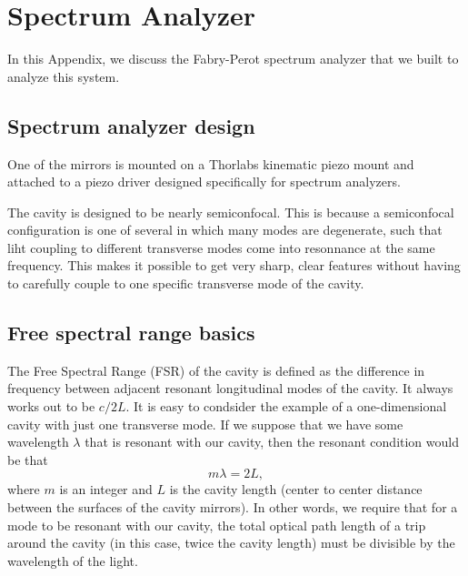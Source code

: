 \chapter{Spectrum Analyzer}
\label{SpectrumAnalyzerAppendix}

In this Appendix, we discuss the Fabry-Perot spectrum analyzer that we built to analyze this system. 

\section{Spectrum analyzer design}
One of the mirrors is mounted on a Thorlabs kinematic piezo mount and attached to a piezo driver designed specifically for spectrum analyzers.

The cavity is designed to be nearly semiconfocal.%
This is because a semiconfocal configuration is one of several in which many modes are degenerate, such that liht coupling to different transverse modes come into resonnance at the same frequency. This makes it possible to get very sharp, clear features without having to carefully couple to one specific transverse mode of the cavity. 


\section{Free spectral range basics}
The Free Spectral Range (FSR) of the cavity is defined as the difference in frequency between adjacent resonant longitudinal modes of the cavity. It always works out to be $c/2L$. 
It is easy to condsider the example of a one-dimensional cavity with just one transverse mode. If we suppose that we have some wavelength $\lambda$ that is resonant with our cavity, then the resonant condition would be that 
\begin{equation}
m\lambda=2L,
\end{equation}
where $m$ is an integer and $L$ is the cavity length (center to center distance between the surfaces of the cavity mirrors). In other words, we require that for a mode to be resonant with our cavity, the total optical path length of a trip around the cavity (in this case, twice the cavity length) must be divisible by the wavelength of the light. 

